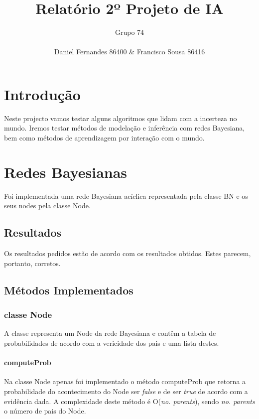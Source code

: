 \documentclass[12pt,a4paper]{article}
\title{Relatório 2º Projeto de IA}
\author{Grupo 74 \\\\ Daniel Fernandes 86400 \& Francisco Sousa 86416}
\begin{document}
\maketitle
\begin{multicols}{2}
	\section{Introdução}
	Neste projecto vamos testar alguns algoritmos que lidam com a incerteza no
	mundo. Iremos testar métodos de modelação e inferência com redes Bayesiana,
	bem como métodos de aprendizagem por interação com o mundo.

	\section{Redes Bayesianas}

	Foi implementada uma rede Bayesiana acíclica representada pela classe BN e os seus nodes pela classe Node.

	\subsection{Resultados}
	Os resultados pedidos estão de acordo com os resultados obtidos. Estes parecem, portanto, corretos. 

	\subsection{Métodos Implementados}
	\subsubsection{classe Node}
	A classe representa um Node da rede Bayesiana e contêm a tabela de probabilidades de acordo com a vericidade dos pais e uma lista destes.
	\paragraph{computeProb}
	Na classe Node apenas foi implementado o método computeProb que retorna a probabilidade do acontecimento do Node ser \textit{false} e de ser \textit{true} de acordo com a evidência dada.
	A complexidade deste método é O(\textit{no. parents}), sendo \textit{no. parents} o número de pais do Node.


\end{multicols}
\end{document}
